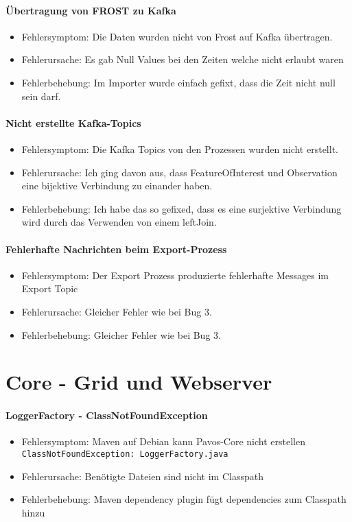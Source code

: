\paragraph{Übertragung von FROST zu Kafka}
\begin{itemize}
	\item Fehlersymptom: Die Daten wurden nicht von Frost auf Kafka übertragen.
	\item Fehlerursache: Es gab Null Values bei den Zeiten welche nicht erlaubt waren
	\item Fehlerbehebung: Im Importer wurde einfach gefixt, dass die Zeit nicht null sein darf.
\end{itemize}

\paragraph{Nicht erstellte Kafka-Topics}
\begin{itemize}
	\item Fehlersymptom: Die Kafka Topics von den Prozessen wurden nicht erstellt.
	\item Fehlerursache: Ich ging davon aus, dass FeatureOfInterest und Observation eine bijektive Verbindung zu einander haben.
	\item Fehlerbehebung: Ich habe das so gefixed, dass es eine surjektive Verbindung wird durch das Verwenden von einem leftJoin.
\end{itemize}

\paragraph{Fehlerhafte Nachrichten beim Export-Prozess}
\begin{itemize}
	\item Fehlersymptom: Der Export Prozess produzierte fehlerhafte Messages im Export Topic
	\item Fehlerursache: Gleicher Fehler wie bei Bug 3.
	\item Fehlerbehebung: Gleicher Fehler wie bei Bug 3.
\end{itemize}
\newpage
\section{Core - Grid und Webserver}
\paragraph{LoggerFactory - ClassNotFoundException}
\begin{itemize}
	\item Fehlersymptom: Maven auf Debian kann Pavos-Core nicht erstellen\\
	\texttt{ClassNotFoundException: LoggerFactory.java}
	\item Fehlerursache: Benötigte Dateien sind nicht im Classpath
	\item Fehlerbehebung: Maven dependency plugin fügt dependencies zum Classpath hinzu
\end{itemize}

